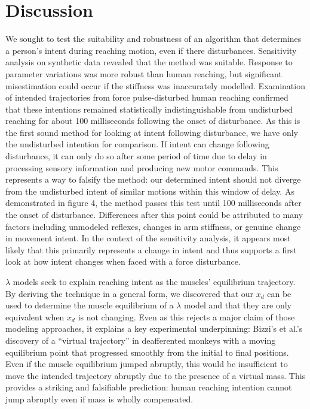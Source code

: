 \documentclass[10pt]{article}
\begin{document}
\section*{Discussion}
We sought to test the suitability and robustness of an algorithm that determines a person's intent during reaching motion, even if there disturbances. Sensitivity analysis on synthetic data revealed that the method was suitable. Response to parameter variations was more robust than human reaching, but significant misestimation could occur if the stiffness was inaccurately modelled. Examination of intended trajectories from force pulse-disturbed human reaching confirmed that these intentions remained statistically indistinguishable from undisturbed reaching for about 100 milliseconds following the onset of disturbance. As this is the first sound method for looking at intent following disturbance, we have only the undisturbed intention for comparison. If intent can change following disturbance, it can only do so after some period of time due to delay in processing sensory information and producing new motor commands. This represents a way to falsify the method: our determined intent should not diverge from the undisturbed intent of similar motions within this window of delay. As demonstrated in figure 4, the method passes this test until 100 milliseconds after the onset of disturbance. Differences after this point could be attributed to many factors including unmodeled reflexes, changes in arm stiffness, or genuine change in movement intent. In the context of the sensitivity analysis, it appears most likely that this primarily represents a change in intent and thus supports a first look at how intent changes when faced with a force disturbance.

$\lambda$ models seek to explain reaching intent as the muscles’ equilibrium trajectory. By deriving the technique in a general form, we discovered that our $x_d$ can be used to determine the muscle equilibrium of a $\lambda$ model and that they are only equivalent when $x_d$ is not changing. Even as this rejects a major claim of those modeling approaches, it explains a key experimental underpinning: Bizzi’s et al.'s \cite{bizzi1984posture} discovery of a “virtual trajectory” in deafferented monkeys with a moving equilibrium point that progressed smoothly from the initial to final positions. Even if the muscle equilibrium jumped abruptly, this would be insufficient to move the intended trajectory abruptly due to the presence of a virtual mass. This provides a striking and falsifiable prediction: human reaching intention cannot jump abruptly even if mass is wholly compensated.
\end{document}
